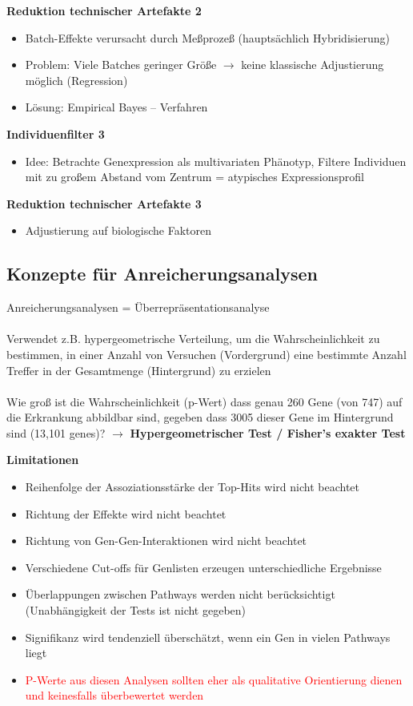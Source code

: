 \textbf{Reduktion technischer Artefakte 2}
\begin{itemize}
	\item Batch-Effekte verursacht durch Meßprozeß (hauptsächlich Hybridisierung)
	\item Problem: Viele Batches geringer Größe $\rightarrow$ keine klassische Adjustierung möglich (Regression)
	\item Lösung: Empirical Bayes – Verfahren
\end{itemize}

\textbf{Individuenfilter 3}
\begin{itemize}
	\item Idee: Betrachte Genexpression als multivariaten Phänotyp,  Filtere Individuen mit zu großem Abstand vom Zentrum = atypisches Expressionsprofil
\end{itemize}

\textbf{Reduktion technischer Artefakte 3}
\begin{itemize}
	\item Adjustierung auf biologische Faktoren
\end{itemize}


\subsection{Konzepte für Anreicherungsanalysen}
Anreicherungsanalysen = Überrepräsentationsanalyse\\\\
Verwendet z.B. hypergeometrische Verteilung, um die Wahrscheinlichkeit zu bestimmen, in einer Anzahl von Versuchen (Vordergrund) eine bestimmte Anzahl Treffer in der Gesamtmenge (Hintergrund) zu erzielen\\\\
Wie groß ist die Wahrscheinlichkeit (p-Wert) dass genau 260 Gene (von 747) auf die Erkrankung abbildbar sind, gegeben dass 3005 dieser Gene im Hintergrund sind (13,101 genes)? $\rightarrow$ \textbf{Hypergeometrischer Test / Fisher’s exakter Test}

\textbf{Limitationen}
\begin{itemize}
	\item Reihenfolge der Assoziationsstärke der Top-Hits wird nicht beachtet
	\item Richtung der Effekte wird nicht beachtet
	\item Richtung von Gen-Gen-Interaktionen wird nicht beachtet
	\item Verschiedene Cut-offs für Genlisten erzeugen unterschiedliche Ergebnisse
	\item Überlappungen zwischen Pathways werden nicht berücksichtigt (Unabhängigkeit der Tests ist nicht gegeben)
	\item Signifikanz wird tendenziell überschätzt, wenn ein Gen in vielen Pathways liegt
	\item \textcolor{red}{P-Werte aus diesen Analysen sollten eher als qualitative Orientierung dienen und keinesfalls überbewertet werden}
\end{itemize}

